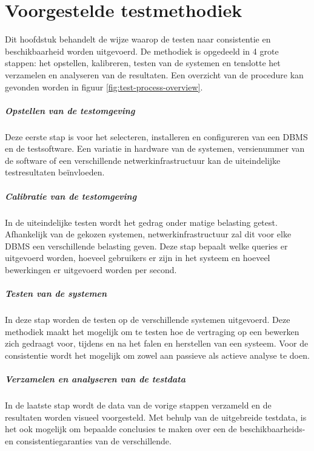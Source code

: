 \chapter{Voorgestelde testmethodiek }	\label{sec:methodiekvantesten}
Dit hoofdstuk behandelt de wijze waarop de testen naar consistentie en beschikbaarheid worden uitgevoerd. 
De methodiek is opgedeeld in 4 grote stappen: het opstellen, kalibreren, testen van de systemen en tenslotte het verzamelen en analyseren van de resultaten. Een overzicht van de procedure kan gevonden worden in figuur \ref{fig:test-process-overview}.

\paragraph{Opstellen van de testomgeving} Deze eerste stap is voor het selecteren, installeren en configureren van een DBMS en de testsoftware. Een variatie in hardware van de systemen, versienummer van de software of een verschillende netwerkinfrastructuur kan de uiteindelijke testresultaten beïnvloeden. 

\paragraph{Calibratie van de testomgeving} In de uiteindelijke testen wordt het gedrag onder matige belasting getest. Afhankelijk van de gekozen systemen, netwerkinfrastructuur zal dit voor elke DBMS een verschillende belasting geven. Deze stap bepaalt welke queries er uitgevoerd worden, hoeveel gebruikers er zijn in het systeem en hoeveel bewerkingen er uitgevoerd worden per second. 

\paragraph{Testen van de systemen} In deze stap worden de testen op de verschillende systemen uitgevoerd. Deze methodiek maakt het mogelijk om te testen hoe de vertraging op een bewerken zich gedraagt voor, tijdens en na het falen en herstellen van een systeem. Voor de consistentie wordt het mogelijk om zowel aan passieve als actieve analyse te doen. 

\paragraph{Verzamelen en analyseren van de testdata} In de laatste stap wordt de data van de vorige stappen verzameld en de resultaten worden visueel voorgesteld. Met behulp van de uitgebreide testdata, is het ook mogelijk om bepaalde conclusies te maken over een de beschikbaarheids- en consistentiegaranties van de verschillende. 

